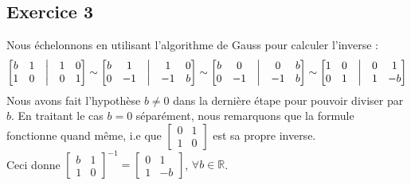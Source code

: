 \documentclass{article}
\newcommand{\R}{\mathbb{R}}
\begin{document}
\subsection*{Exercice 3}
\noindent Nous échelonnons en utilisant l'algorithme de Gauss pour calculer l'inverse :
$$\begin{bmatrix}
b & 1 & \bigm| & 1 & 0 \\
1 & 0 & \bigm| & 0 & 1
\end{bmatrix} 
\sim
\begin{bmatrix}
b & 1 & \bigm| & 1 & 0 \\
0 & -1 & \bigm| & -1 & b
\end{bmatrix} \sim 
\begin{bmatrix}
b & 0 & \bigm| & 0 & b \\
0 & -1 & \bigm| & -1 & b
\end{bmatrix} \sim
\begin{bmatrix}
1 & 0 & \bigm| & 0 & 1 \\
0 & 1 & \bigm| & 1 & -b
\end{bmatrix} $$
Nous avons fait l'hypothèse $b \neq 0$ dans la dernière étape pour pouvoir diviser par $b$. En traitant le cas $b=0$ séparément, nous remarquons que la formule fonctionne quand même, i.e que $\begin{bmatrix}
0 & 1\\
1 & 0
\end{bmatrix}$ est sa propre inverse. \\
Ceci donne $\begin{bmatrix} b & 1 \\ 1 &  0\end{bmatrix}^{-1} = \begin{bmatrix} 0 & 1 \\ 1 &  -b\end{bmatrix}$, $\forall b \in \R$. \\ 
\end{document}
